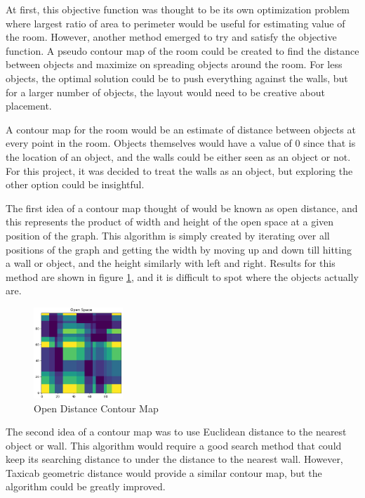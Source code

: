 \documentclass[conference]{IEEEtran}
\begin{document}
    At first, this objective function was thought to be its own optimization problem where largest ratio of area to perimeter would be useful for estimating value of the room. However, another method emerged to try and satisfy the objective function. A pseudo contour map of the room could be created to find the distance between objects and maximize on spreading objects around the room. For less objects, the optimal solution could be to push everything against the walls, but for a larger number of objects, the layout would need to be creative about placement.
    
    A contour map for the room would be an estimate of distance between objects at every point in the room. Objects themselves would have a value of 0 since that is the location of an object, and the walls could be either seen as an object or not. For this project, it was decided to treat the walls as an object, but exploring the other option could be insightful.
    
    The first idea of a contour map thought of would be known as open distance, and this represents the product of width and height of the open space at a given position of the graph. This algorithm is simply created by iterating over all positions of the graph and getting the width by moving up and down till hitting a wall or object, and the height similarly with left and right. Results for this method are shown in figure \ref{open_dist_fig}, and it is difficult to spot where the objects actually are. 
    \begin{figure}
        \centering
        \includegraphics[width=0.3\textwidth]{contour_map_opendist.png}
        \caption{Open Distance Contour Map}
        \label{open_dist_fig}
    \end{figure}

    The second idea of a contour map was to use Euclidean distance to the nearest object or wall. This algorithm would require a good search method that could keep its searching distance to under the distance to the nearest wall. However, Taxicab geometric distance would provide a similar contour map, but the algorithm could be greatly improved. 
\end{document}
